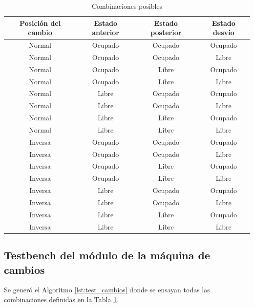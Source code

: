 			\begin{table}[!hbt]
			\renewcommand{\arraystretch}{1.3}
			\caption{Combinaciones posibles}
			\label{tabla_cambios}
			\centering
			\begin{tabular}{ c  c  c  c}
			\hline
			Posición del cambio & Estado anterior & Estado posterior & Estado desvío \\	
			\hline
			Normal & Ocupado & Ocupado  & Ocupado \\
			Normal & Ocupado & Ocupado  & Libre \\
			Normal & Ocupado & Libre  & Ocupado \\
			Normal & Ocupado & Libre  & Libre \\
			Normal & Libre & Ocupado  & Ocupado \\
			Normal & Libre & Ocupado  & Libre \\
			Normal & Libre & Libre  & Ocupado \\
			Normal & Libre & Libre  & Libre \\
			Inversa & Ocupado & Ocupado  & Ocupado \\
			Inversa & Ocupado & Ocupado  & Libre \\
			Inversa & Ocupado & Libre  & Ocupado \\
			Inversa & Ocupado & Libre  & Libre \\
			Inversa & Libre & Ocupado  & Ocupado \\
			Inversa & Libre & Ocupado  & Libre \\
			Inversa & Libre & Libre  & Ocupado \\
			Inversa & Libre & Libre  & Libre \\	
			\end{tabular}
			\end{table}	
	
	\subsection{Testbench del módulo de la máquina de cambios}
			
		Se generó el Algoritmo \ref{lst:test_cambios} donde se ensayan todas las combinaciones definidas en la Tabla \ref{tabla_cambios}.
			
